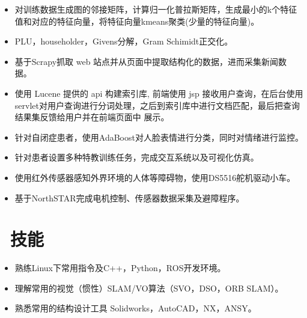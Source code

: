 \documentclass{resume}
\begin{document}
\begin{itemize}\small
  \item 对训练数据生成图的邻接矩阵，计算归一化普拉斯矩阵，生成最小的k个特征值和对应的特征向量，将特征向量kmeans聚类(少量的特征向量)。
\end{itemize}

\begin{itemize}\small
  \item PLU，householder，Givens分解，Gram Schimidt正交化。
\end{itemize}

\begin{itemize}\small
  \item 基于Scrapy抓取 web 站点并从页面中提取结构化的数据，进而采集新闻数据。
  \item 使用 Lucene 提供的 api 构建索引库, 前端使用 jsp 接收用户查询，在后台使用servlet对用户查询进行分词处理，之后到索引库中进行文档匹配，最后把查询结果集反馈给用户并在前端页面中 展示。
\end{itemize}

\begin{itemize}\small
  \item 针对自闭症患者，使用AdaBoost对人脸表情进行分类，同时对情绪进行监控。
  \item 针对患者设置多种特教训练任务，完成交互系统以及可视化仿真。
\end{itemize}


\begin{itemize}\small
  \item 使用红外传感器感知外界环境的人体等障碍物，使用DS5516舵机驱动小车。
  \item 基于NorthSTAR完成电机控制、传感器数据采集及避障程序。
\end{itemize}

\section{\faCogs\ 技能}
\begin{itemize}\small
\item 熟练Linux下常用指令及C++，Python，ROS开发环境。
\item 理解常用的视觉（惯性）SLAM/VO算法（SVO，DSO，ORB SLAM）。
\item 熟悉常用的结构设计工具 Solidworks，AutoCAD，NX，ANSY。
\end{itemize}
\end{document}
